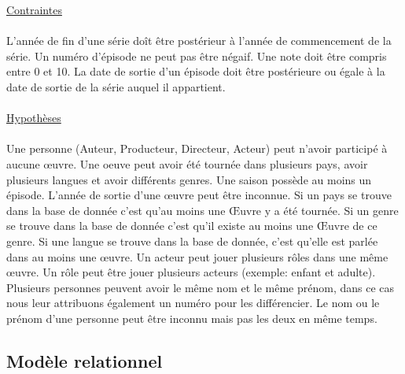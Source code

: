 \documentclass[10pt,a4paper]{article}
\begin{document}
\noindent\underline{Contraintes}
\\ \\ L'année de fin d'une série doît être postérieur à l'année de commencement de la série. Un numéro d’épisode ne peut pas être négaif. Une note doit être compris entre 0 et 10.
La date de sortie d’un épisode doit être postérieure ou égale à la date de sortie de la série auquel il appartient.
\\
\\
\noindent\underline{Hypothèses}
\\ \\ Une personne (Auteur, Producteur, Directeur, Acteur) peut n’avoir participé à aucune œuvre.
Une oeuve peut avoir été tournée dans plusieurs pays, avoir plusieurs langues et avoir différents genres.
Une saison possède au moins un épisode.
L’année de sortie d’une œuvre peut être inconnue.
Si un pays se trouve dans la base de donnée c’est qu’au moins une Œuvre y a été tournée.
Si un genre se trouve dans la base de donnée c’est qu’il existe au moins une Œuvre de ce genre.
Si une langue se trouve dans la base de donnée, c’est qu’elle est parlée dans au moins une œuvre.
Un acteur peut jouer plusieurs rôles dans une même œuvre.
Un rôle peut être jouer plusieurs acteurs (exemple: enfant et adulte).
Plusieurs personnes peuvent avoir le même nom et le même prénom, dans ce cas nous leur attribuons également un numéro pour les différencier.
Le nom ou le prénom d’une personne peut être inconnu mais pas les deux en même temps.

\subsection{Modèle relationnel}
\end{document}

